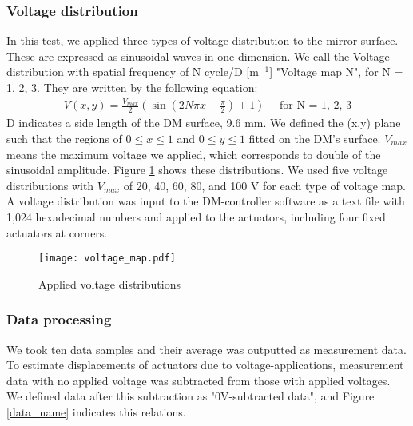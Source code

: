 \documentclass[a4paper]{article}
\begin{document}
\subsubsection{Voltage distribution}
In this test, we applied three types of voltage distribution to the mirror surface. These are expressed as sinusoidal waves in one dimension. We call the Voltage distribution with spatial frequency of N cycle/D [m$^{-1}$] "Voltage map N", for N = 1, 2, 3. They are written by the following equation:
\begin{eqnarray}
V(x,y) = \frac{V_{max}}{2} \left( \sin \left( 2N \pi x - \frac{\pi}{2} \right) + 1 \right) \mbox{~~~~for N = 1, 2, 3}
\end{eqnarray}
D indicates a side length of the DM surface, 9.6 mm. We defined the (x,y) plane such that the regions of $0 \leq x \leq 1$ and $0 \leq y \leq 1$ fitted on the DM's surface. $V_{max}$ means the maximum voltage we applied, which corresponds to double of the sinusoidal amplitude. Figure \ref{voltage_map} shows these distributions. We used five voltage distributions with $V_{max}$ of 20, 40, 60, 80, and 100 V for each type of voltage map. A voltage distribution was input to the DM-controller software as a text file with 1,024 hexadecimal numbers and applied to the actuators, including four fixed actuators at corners.

\begin{figure}[htbp]
\centering
\texttt{[image: voltage\_map.pdf]}
\caption{Applied voltage distributions}
\label{voltage_map}
\end{figure}

\subsubsection{Data processing}
\label{data_process}
We took ten data samples and their average was outputted as measurement data. To estimate displacements of actuators due to voltage-applications, measurement data with no applied voltage was subtracted from those with applied voltages. We defined data after this subtraction as "0V-subtracted data", and Figure \ref{data_name} indicates this relations.
\end{document}
